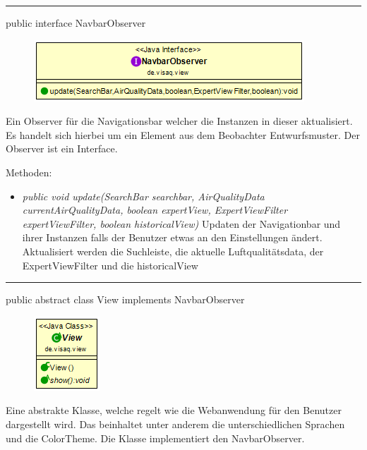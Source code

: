 \rule{\textwidth}{0.4pt}
public interface NavbarObserver

\begin{minipage}{0.4\textwidth}
    \begin{figure}[H]
        \includegraphics[scale = 0.5]{media/frontend/view/de.view/NavbarObserver_Class.png}
    \end{figure}
\end{minipage} \hfill
\begin{minipage}{0.5\textwidth}
    Ein Observer für die Navigationsbar welcher die Instanzen in dieser aktualisiert. Es handelt sich hierbei um ein Element aus dem Beobachter Entwurfsmuster. Der Observer ist ein Interface.
\end{minipage}

Methoden:
\begin{itemize} 
    \item \emph{public void update(SearchBar searchbar, AirQualityData currentAirQualityData,
    boolean expertView, ExpertViewFilter expertViewFilter, boolean historicalView)} Updaten der Navigationbar und ihrer Instanzen falls der Benutzer etwas an den Einstellungen ändert. Aktualisiert werden die Suchleiste, die aktuelle Luftqualitätsdata, der ExpertViewFilter und die historicalView
\end{itemize}

\rule{\textwidth}{0.4pt}
public abstract class View implements NavbarObserver

\begin{minipage}{0.3\textwidth}
    \begin{figure}[H]
        \includegraphics[scale = 0.7]{media/frontend/view/de.view/View_Class.png}
    \end{figure}
\end{minipage} \hfill
\begin{minipage}{0.7\textwidth}
    Eine abstrakte Klasse, welche regelt wie die Webanwendung für den Benutzer dargestellt wird. Das beinhaltet unter anderem die unterschiedlichen Sprachen und die ColorTheme. Die Klasse implementiert den NavbarObserver.
\end{minipage}


